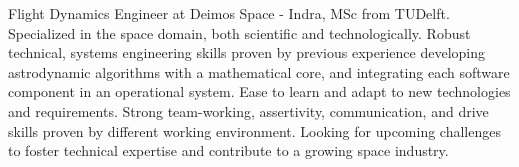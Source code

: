 \documentclass[letter,10pt]{article}
\begin{document}
\justifying

Flight Dynamics Engineer at Deimos Space - Indra, MSc from TUDelft. Specialized in the space domain, both scientific and technologically. Robust technical, systems engineering skills proven by previous experience developing astrodynamic algorithms with a mathematical core, and integrating each software component in an operational system. Ease to learn and adapt to new technologies and requirements. Strong team-working, assertivity, communication, and drive skills proven by different working environment. Looking for upcoming challenges to foster technical expertise and contribute to a growing space industry.
\end{document}
